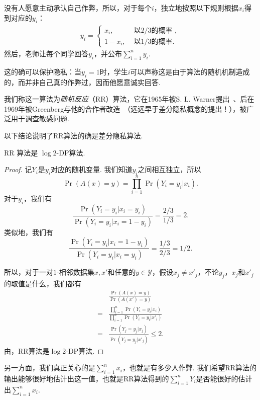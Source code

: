 没有人愿意主动承认自己作弊，所以，对于每个$i$，独立地按照以下规则根据$x_i$得到对应的$y_i$：
\[\begin{aligned}
    y_i =
    \begin{cases}
        x_i, & \text{ 以$2/3$的概率 }, \\
        1 - x_i,& \text{ 以$1/3$的概率}.
    \end{cases}
\end{aligned}\]
然后，老师让每个同学回答$y_i$，并公布$\sum_{i=1}^n y_i$. 

这的确可以保护隐私：当$y_i = 1$时，学生$i$可以声称这是由于算法的随机机制造成的，而并非自己真的作弊过，因而他愿意诚实回答. 

我们称这一算法为\textit{随机反应}（RR）算法，它在1965年被S. L. Warner提出~\cite{warnerRandomizedResponseSurvey1965}、后在1969年被Greenberg与他的合作者改造~\cite{greenbergUnrelatedQuestionRandomized1969}（远远早于差分隐私概念的提出！），被广泛用于调查敏感问题.

以下结论说明了RR算法的确是差分隐私算法.

\begin{theorem}
    RR 算法是 $\log 2$-DP算法.
\end{theorem}
\begin{proof}
记$Y_i$是$y_i$对应的随机变量. 我们知道$y_i$之间相互独立，所以
    \[
    \Pr(A(x) = y) = \prod_{i=1}^n \Pr(Y_i = y_i  | x_i).
    \]
对于$y_i$，我们有
    \[
    \frac{\Pr(Y_i = y_i  | x_i = y_i)}{\Pr(Y_i = y_i  | x_i = 1 - y_i)} = \frac{2/3}{1/3} = 2.
    \]
类似地，我们有
    \[
    \frac{\Pr(Y_i = y_i  | x_i = 1 - y_i)}{\Pr(Y_i = y_i  | x_i = y_i)} = \frac{1/3}{2/3} = 1/2.
    \]

所以，对于一对$1$-相邻数据集$x, x'$和任意的$y \in \mathcal Y$，假设$x_j \neq x'_j$，不论$y_j$，$x_j$和$x'_j$的取值是什么，我们都有
    \begin{align*}
    & \frac{\Pr(A(x) = y)}{\Pr(A(x') = y)} \\
    =& \frac{\prod_{i=1}^n \Pr(Y_i = y_i  | x_i)}{\prod_{i=1}^n \Pr(Y_i = y_i  | x'_i)} \\
    =& \frac{\Pr(Y_j = y_j  | x_j)}{\Pr(Y_j = y_j  | x'_j)}\leq 2.
    \end{align*}
由，RR算法是$\log 2$-DP算法.
\end{proof}

另一方面，我们真正关心的是$\sum_{i=1}^n x_i$，也就是有多少人作弊. 我们希望RR算法的输出能够很好地估计出这一值，也就是RR算法得到的$\sum_{i=1}^n Y_i$是否能很好的估计出$\sum_{i=1}^n x_i$. 

